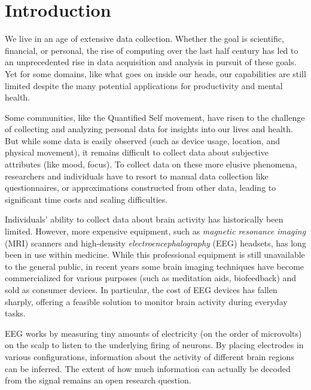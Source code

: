 \chapter{Introduction}




We live in an age of extensive data collection. Whether the goal is scientific, financial, or personal, the rise of computing over the last half century has led to an unprecedented rise in data acquisition and analysis in pursuit of these goals. Yet for some domains, like what goes on inside our heads, our capabilities are still limited despite the many potential applications for productivity and mental health.


Some communities, like the Quantified Self movement, have risen to the challenge of collecting and analyzing personal data for insights into our lives and health. But while some data is easily observed (such as device usage, location, and physical movement), it remains difficult to collect data about subjective attributes (like mood, focus). To collect data on these more elusive phenomena, researchers and individuals have to resort to manual data collection like questionnaires, or approximations constructed from other data, leading to significant time costs and scaling difficulties.\cite{malhi_promise_2017}


Individuals' ability to collect data about brain activity has historically been limited. However, more expensive equipment, such as \emph{magnetic resonance imaging} (MRI) scanners and high-density \emph{electroencephalography} (EEG) headsets, has long been in use within medicine. While this professional equipment is still unavailable to the general public, in recent years some brain imaging techniques have become commercialized for various purposes (such as meditation aids, biofeedback) and sold as consumer devices. In particular, the cost of EEG devices has fallen sharply, offering a feasible solution to monitor brain activity during everyday tasks.

EEG works by measuring tiny amounts of electricity (on the order of microvolts) on the scalp to listen to the underlying firing of neurons. By placing electrodes in various configurations, information about the activity of different brain regions can be inferred. The extent of how much information can actually be decoded from the signal remains an open research question.

